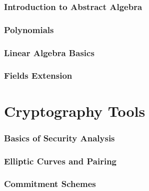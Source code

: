 \documentclass{config/zkdl-template}
\begin{document}
    \section{Introduction to Abstract Algebra}\label{section:abstract-algebra}
    

    \section{Polynomials}\label{section:polynomial-rings}
    

    \section{Linear Algebra Basics}\label{section:linear-algebra}
    

    \section{Fields Extension}\label{section:finite-fields}
    


    \part{Cryptography Tools}
    

    \section{Basics of Security Analysis}\label{section:security-analysis}
    

    \section{Elliptic Curves and Pairing}\label{section:elliptic-curves}
    

    \section{Commitment Schemes}\label{section:commitment-schemes}
    
\end{document}
